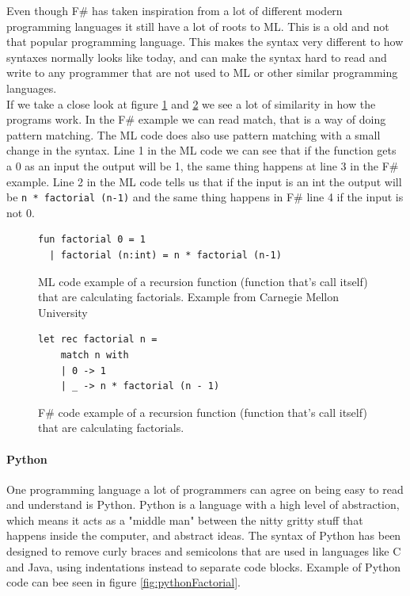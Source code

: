 \documentclass[12pt, a4paper]{article}
\newcommand{\code}[1]{{\small \texttt{#1}}}
\begin{document}
Even though F\# has taken inspiration from a lot of different modern programming languages it still have a lot of roots to ML. This is a old and not that popular programming language. This makes the syntax very different to how syntaxes normally looks like today, and can make the syntax hard to read and write to any programmer that are not used to ML or other similar programming languages.\\

If we take a close look at figure \ref{fig:factorialMLExample} and \ref{fig:factorialFsharpExample} we see a lot of similarity in how the programs work. In the F\# example we can read match, that is a way of doing pattern matching. The ML code does also use pattern matching with a small change in the syntax. Line 1 in the ML code we can see that if the function gets a 0 as an input the output will be 1, the same thing happens at line 3 in the F\# example. Line 2 in the ML code tells us that if the input is an int the output will be \code{n * factorial (n-1)} and the same thing happens in F\# line 4 if the input is not 0.\\

\begin{figure}[!h]
	\begin{lstlisting}
fun factorial 0 = 1
  | factorial (n:int) = n * factorial (n-1)
	\end{lstlisting}
	\caption{ML code example of a recursion function (function that's call itself) that are calculating factorials. Example from Carnegie Mellon University\cite{carnegieMellon}}
	\label{fig:factorialMLExample}
\end{figure}

\begin{figure}[!h]
	\begin{lstlisting}
let rec factorial n =
    match n with
    | 0 -> 1
    | _ -> n * factorial (n - 1)
	\end{lstlisting}
	\caption{F\# code example of a recursion function (function that's call itself) that are calculating factorials.}
	\label{fig:factorialFsharpExample}
\end{figure}

\newpage
\paragraph{Python}

One programming language a lot of programmers can agree on being easy to read and understand is Python. Python is a language with a high level of abstraction, which means it acts as a "middle man" between the nitty gritty stuff that happens inside the computer, and abstract ideas. The syntax of Python has been designed to remove curly braces and semicolons that are used in languages like C and Java, using indentations instead to separate code blocks. Example of Python code can bee seen in figure \ref{fig:pythonFactorial}.\\
\end{document}
